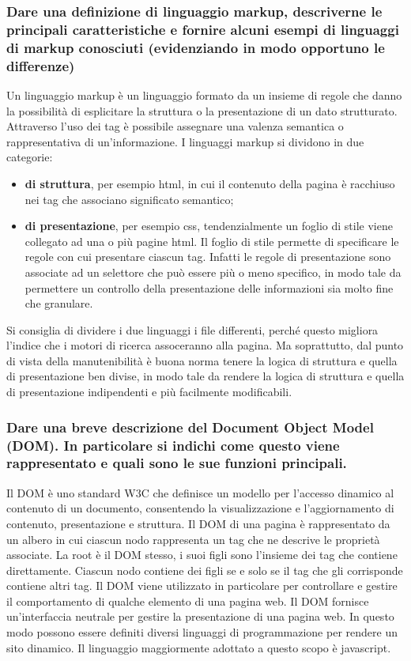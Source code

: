\documentclass[12pt]{article}
\begin{document}
\subsubsection{Dare una definizione di linguaggio markup, descriverne le
	principali caratteristiche e fornire alcuni esempi di linguaggi di markup
	conosciuti (evidenziando in modo opportuno le differenze)}

Un linguaggio markup è un linguaggio formato da un insieme di regole che danno
la possibilità di esplicitare la struttura o la presentazione di un dato
strutturato. Attraverso l'uso dei tag è possibile assegnare una valenza
semantica o rappresentativa di un'informazione. I linguaggi markup si dividono
in due categorie:
\begin{itemize}
	\item \textbf{di struttura}, per esempio html, in cui il contenuto della
	      pagina è racchiuso nei tag che associano significato semantico;

	\item \textbf{di presentazione}, per esempio css, tendenzialmente un foglio
	      di stile viene collegato ad una o più pagine html. Il foglio di stile
	      permette di specificare le regole con cui presentare ciascun tag.
	      Infatti le regole di presentazione sono associate ad un selettore che
	      può essere più o meno specifico, in modo tale da permettere un controllo
	      della presentazione delle informazioni sia molto fine che granulare.
\end{itemize}

Si consiglia di dividere i due linguaggi i file differenti, perché questo
migliora l'indice che i motori di ricerca assoceranno alla pagina. Ma
soprattutto, dal punto di vista della manutenibilità è buona norma tenere la
logica di struttura e quella di presentazione ben divise, in modo tale da
rendere la logica di struttura e quella di presentazione indipendenti e più
facilmente modificabili.


\subsubsection{Dare una breve descrizione del Document Object Model (DOM). In
	particolare si indichi come questo viene rappresentato e quali sono le sue
	funzioni principali.}

Il DOM è uno standard W3C che definisce un modello per l'accesso dinamico al
contenuto di un documento, consentendo la visualizzazione e l'aggiornamento di
contenuto, presentazione e struttura.
Il DOM di una pagina è rappresentato da un albero in cui ciascun nodo
rappresenta un tag che ne descrive le proprietà associate. La root è il DOM
stesso, i suoi figli sono l'insieme dei tag che contiene direttamente. Ciascun
nodo contiene dei figli se e solo se il tag che gli corrisponde contiene altri
tag. Il DOM viene utilizzato in particolare per controllare e gestire il
comportamento di qualche elemento di una pagina web. Il DOM fornisce
un'interfaccia neutrale per gestire la presentazione di una pagina web. In
questo modo possono essere definiti diversi linguaggi di programmazione per
rendere un sito dinamico. Il linguaggio maggiormente adottato a questo scopo è
javascript.
\end{document}
